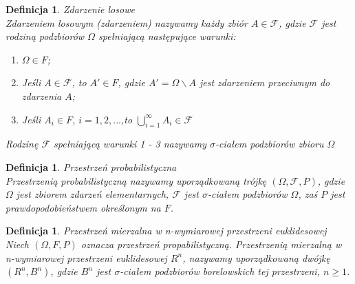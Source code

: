 \documentclass[12pt,a4paper]{report}
\newtheorem{definition}[theorem]{Definicja}
\begin{document}
\begin{definition}{Zdarzenie losowe \cite[w oparciu o rozdział 1.1]{krysicki1999}\\}
Zdarzeniem losowym (zdarzeniem) nazywamy każdy zbiór $\textit{A} \in \mathcal{F}$, gdzie $\mathcal{F}$ jest rodziną podzbiorów $\Omega$ spełniającą następujące warunki:
\begin{enumerate}
\item $\Omega \in F$;
\item Jeśli $A \in \mathcal{F}$, to $\textit{A$'$} \in \textit{F}$, gdzie $\textit{A$'$} = \Omega \backslash A $ jest zdarzeniem przeciwnym do zdarzenia $\textit{A}$;
\item Jeśli $\textit{A}_{i} \in \textit{F}$, $i= 1, 2, ...$,to $\bigcup\limits_{i=1}^{\infty} A_{i} \in \mathcal{F} $
\end{enumerate}
Rodzinę $\mathcal{F}$ spełniającą warunki 1 - 3 nazywamy $\sigma$-ciałem podzbiorów zbioru $\Omega$\\
\end{definition}

\begin{definition}{Przestrzeń probabilistyczna \cite[w oparciu o rozdział 1.2]{krysicki1999}\\}
Przestrzenią probabilistyczną nazywamy uporządkowaną trójkę $(\Omega, \mathcal{F}, P)$, gdzie $\Omega$ jest zbiorem zdarzeń elementarnych, $\mathcal{F}$ jest $\sigma$-ciałem podzbiorów $\Omega$, zaś $P$ jest prawdopodobieństwem określonym na $F$.\\
\end{definition}

\begin{definition}{Przestrzeń mierzalna w n-wymiarowej przestrzeni euklidesowej \cite[Rozdział 1]{bartoszewicz1996}\\}
Niech $(\Omega, F, P)$ oznacza przestrzeń propabilistyczną. Przestrzenią mierzalną w n-wymiarowej przestrzeni euklidesowej $R^n$, nazywamy uporządkowaną dwójkę $(R^n, \textit{B}^n)$, gdzie $\textit{B}^n$ jest $\sigma$-ciałem podzbiorów borelowskich tej przestrzeni, $n \geq 1$. \\
\end{definition}
\end{document}
